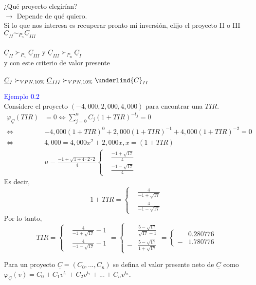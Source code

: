 ¿Qué proyecto elegirían?\\
$\rightarrow$ Depende de qué quiero.\\
Si lo que nos interesa es recuperar pronto mi inversión, elijo el proyecto II o III $\phantom{ab}$
$\underline{C}_{II} \sim_{P_n} \underline{C}_{III}$\\ \\
$\underline{C}_{II} \succ_{P_n} \underline{C}_{III}$ y $\underline{C}_{III}\succ_{P_n} \underline{C}_{I}$\\
y con este criterio de valor presente\\ \\
$\underline{C}_I \succ_{VPN, 10\%}\underline{C}_{III}   \succ_{VPN,10\%}\underlind{C}_{II}$



\textcolor{blue}{Ejemplo 0.2}\\
Considere el proyecto $(-4,000,2,000,4,000)$ para encontrar una $TIR$.
\begin{align*}
    \varphi_{\underline{C}}(TIR) &= 0 \Leftrightarrow \sum_{j=0}^n C_j(1+TIR)^{-t_j} =0\\
    \Leftrightarrow & -4,000(1+TIR)^0 + 2,000(1+TIR)^{-1} + 4,000(1+TIR)^{-2} = 0\\
    \Leftrightarrow & 4,000=4,000x^2 + 2,000x, x=(1+TIR)\\
    &u=\frac{-1\pm\sqrt{1+4\cdot 2\cdot 2}}{4} \begin{cases}
        &\frac{-1+\sqrt{17}}{4}\\
        &\frac{-1-\sqrt{17}}{4}
    \end{cases}
\end{align*}
Es decir,
$$1+TIR = \begin{cases} 
&\frac{4}{-1+\sqrt{17}}\\
&\frac{4}{-1-\sqrt{17}}
\end{cases}$$
Por lo tanto,
$$TIR =\begin{cases} 
&\frac{4}{-1+\sqrt{17}}-1\\
&\frac{4}{-1-\sqrt{17}}-1
\end{cases} = \begin{cases} 
&\frac{5-\sqrt{17}}{\sqrt{17}-1}\\
-&\frac{5-\sqrt{17}}{1+\sqrt{17}}
\end{cases}= \begin{cases} 
&0.280776\\
-&1.780776
\end{cases}
$$

\begin{definition}
Para un proyecto $\underline{C} =(C_0,...,C_n)$ se defina el valor presente neto de $\underline{C}$ como $\varphi_{\underline{C}}(v) = C_0 + C_1 v^{t_1} + C_2v^{t_2} + ...+ C_nv^{t_n}$.
\end{definition}
 
